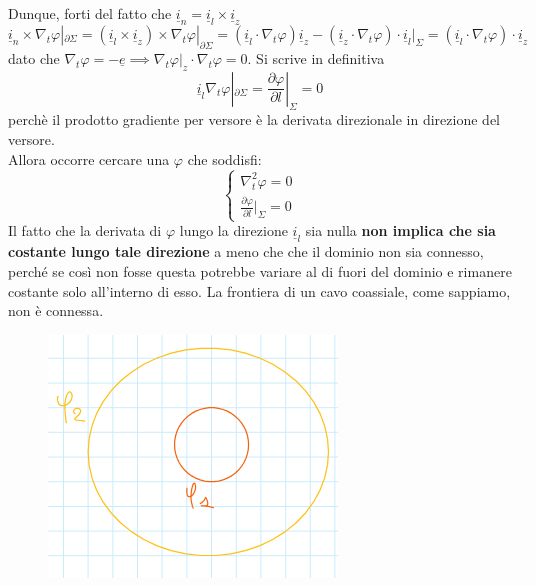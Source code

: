 \documentclass{book}
\begin{document}
        Dunque, forti del fatto che $\underline{i}_{n} = \underline{i}_{l} \times \underline{i}_{z}$
        \begin{equation}
            \underline{i}_{n} \times \nabla_{t} \varphi |_{\partial \Sigma} = (\underline{i}_{l} \times \underline{i}_{z}) \times \nabla_{t} \varphi |_{\partial \Sigma} = (\underline{i}_{l} \cdot \nabla_{t} \varphi) \underline{i}_{z} -
            (\underline{i}_{z} \cdot  \nabla_{t}\varphi) \cdot \underline{i}_{l}|_{\Sigma} = (\underline{i}_{l} \cdot \nabla_{t} \varphi ) \cdot \underline{i}_{z}
        \end{equation}
        dato che $\nabla_{t} \varphi = - \underline{e} \implies \nabla_{t}\varphi|_{z} \cdot \nabla_{t} \varphi = 0$. Si scrive in definitiva 
        \begin{equation}
            \underline{i}_{l} \nabla_{t} \varphi |_{\partial \Sigma} = \frac{\partial \varphi}{\partial l}|_{\Sigma} = 0
        \end{equation}
        perchè il prodotto gradiente per versore è la derivata direzionale in direzione del versore. \\ 
        Allora occorre cercare una $\varphi$ che soddisfi:
        \begin{equation}
            \begin{cases}
                \nabla_{t} ^{2} \varphi = 0 \\
                \displaystyle \frac{\partial \varphi}{\partial l}|_{\Sigma} = 0
            \end{cases}
        \end{equation}
        Il fatto che la derivata di $\varphi$ lungo la direzione  $\underline{i}_{l}$ sia nulla \textbf{non implica che sia costante lungo tale direzione} a meno che che il dominio non sia connesso,
        perché se così non fosse questa potrebbe variare al di fuori del dominio e rimanere costante solo all'interno di esso. La frontiera di un cavo coassiale, come sappiamo, non è connessa.\\
        \begin{figure}[h!]
            \center  
            \includegraphics[width=0.6\linewidth]{img/Chapter_three/Chapt3img7.png}
        \end{figure}
\end{document}
